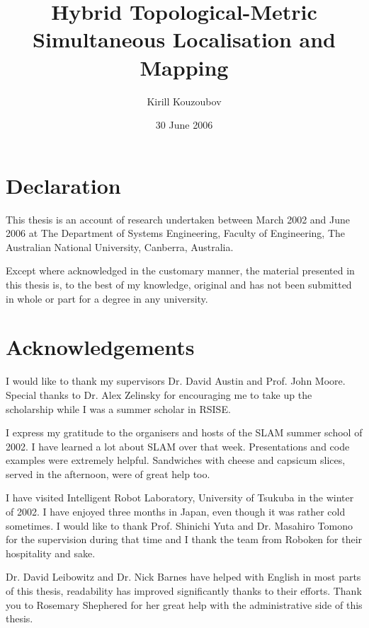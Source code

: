 \documentclass[11pt,onecolum,a4paper,oneside]{book}
\title{Hybrid Topological-Metric Simultaneous Localisation and
  Mapping}
\author{Kirill Kouzoubov}
\begin{document}
\date{30 June 2006}

\maketitle
\normalsize

\onehalfspace
\chapter*{Declaration}

This thesis is an account of research undertaken between March 2002
and June 2006 at The Department of Systems Engineering, Faculty of
Engineering, The Australian National University, Canberra, Australia.

Except where acknowledged in the customary manner, the material 
presented in this thesis is, to the best of my knowledge, original and 
has not been submitted in whole or part for a degree in any 
university.

\chapter*{Acknowledgements}

I would like to thank my supervisors Dr. David Austin and Prof. John
Moore. Special thanks to Dr. Alex Zelinsky for encouraging me to take
up the scholarship while I was a summer scholar in RSISE.

I express my gratitude to the organisers and hosts of the SLAM summer
school of 2002. I have learned a lot about SLAM over that week.
Presentations and code examples were extremely helpful.  Sandwiches
with cheese and capsicum slices, served in the afternoon, were of
great help too.

I have visited Intelligent Robot Laboratory, University of Tsukuba in
the winter of 2002. I have enjoyed three months in Japan, even though
it was rather cold sometimes. I would like to thank Prof. Shinichi
Yuta and Dr. Masahiro Tomono for the supervision during that time and
I thank the team from Roboken for their hospitality and sake.

Dr. David Leibowitz and Dr. Nick Barnes have helped with English in
most parts of this thesis, readability has improved significantly
thanks to their efforts. Thank you to Rosemary Shephered for her great
help with the administrative side of this thesis.

\end{document}
